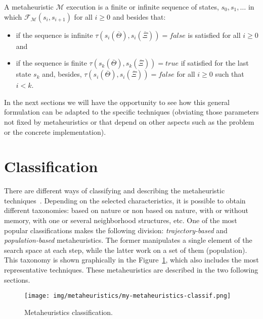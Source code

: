 \begin{definition} A metaheuristic $\mathcal{M}$ execution is a finite or infinite sequence of states, $s_0, s_1, \ldots$ in which $\mathcal{F}_\mathcal{M}(s_i,s_{i+1})$ for all $i\geq 0$ and
	besides that:
	\begin{itemize}
		\item if the sequence is infinite $\tau(s_i(\overline{\Theta}), s_i(\overline{\Xi})) = false$ is satisfied for all $i \geq 0$ and
		
		\item if the sequence is finite $\tau(s_k(\overline{\Theta}), s_k(\overline{\Xi})) = true$ if satisfied for the last state $s_k$ and, besides, $\tau(s_i(\overline{\Theta}), s_i(\overline{\Xi})) = false$ for all $i \geq 0$ such that $i < k$.
	\end{itemize}
	
\end{definition}

In the next sections we will have the opportunity to see how this general formulation can be adapted to the specific techniques (obviating those parameters not fixed by metaheuristics or that depend on other aspects such as the problem or the concrete implementation).

\section{Classification}\label{sec:MetaheuristicsClassification}

There are different ways of classifying and describing the metaheuristic techniques~\cite{blum03metaheuristics}. Depending on the selected characteristics, it is possible to obtain different taxonomies: based on nature or non based on nature, with or without memory, with one or several neighborhood structures, etc. One of the most popular classifications makes the following division: \emph{trajectory-based} and \emph{population-based} metaheuristics. The former manipulates a single element of the search space at each step, while the latter work on a set of them (population). This taxonomy is shown graphically in the Figure~\ref{fig:MetaheuristicsClassification}, which also includes the most representative techniques. These metaheuristics are described in the two following sections.

\begin{figure}[H] %
	\centering
	\vspace{0.5cm} \centering \texttt{[image: img/metaheuristics/my-metaheuristics-classif.png]} 
	\caption{Metaheuristics classification.}\label{fig:MetaheuristicsClassification}
\end{figure}


